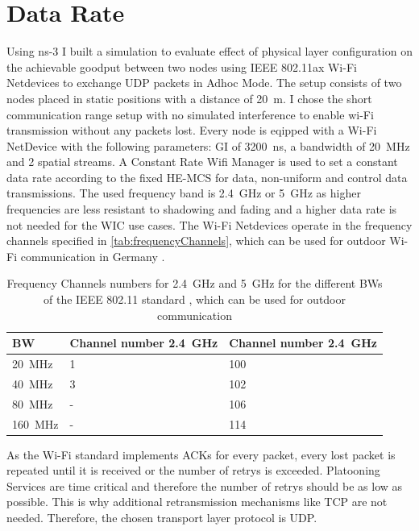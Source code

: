 \section{Data Rate}

Using ns-3 I built a simulation to evaluate effect of physical layer configuration on the achievable goodput between two nodes using IEEE 802.11ax Wi-Fi Netdevices to exchange UDP packets in Adhoc Mode.
The setup consists of two nodes placed in static positions with a distance of \SI{20}{\metre}. I chose the short communication range setup with no simulated interference to enable wi-Fi transmission without any packets lost.
Every node is eqipped with a Wi-Fi NetDevice with the following parameters: \ac{GI} of \SI{3200}{\nano\second}, a bandwidth of \SI{20}{\mega\hertz} and 2 spatial streams.
A Constant Rate Wifi Manager is used to set a constant data rate according to the fixed HE-\ac{MCS} for data, non-uniform and control data transmissions. The used frequency band is \SI{2.4}{\giga\hertz} or \SI{5}{\giga\hertz} as
higher frequencies are less resistant to shadowing and fading and a higher data rate is not needed for the \ac{WIC} use cases.
The Wi-Fi Netdevices operate in the frequency channels specified in \autoref{tab:frequencyChannels}, which can be used for
outdoor Wi-Fi communication in Germany \cite{GermanLaw}.

\begin{table}
	\centering
	\begin{tabular}{>{\centering}p{2cm}p{4cm}p{4cm}}
		\toprule
		\ac{BW} & Channel number \SI{2.4}{\giga\hertz} & Channel number \SI{2.4}{\giga\hertz}\\
		\midrule
		\SI{20}{\mega\hertz} & \num{1}&
		\num{100} \\
		\SI{40}{\mega\hertz} &
		\num{3}
		& \num{102} \\
		\SI{80}{\mega\hertz} &
		- & \num{106} \\
		\SI{160}{\mega\hertz} & -
		& \num{114} \\
		\bottomrule
	\end{tabular}
	\caption{Frequency Channels numbers for \SI{2.4}{\giga\hertz} and \SI{5}{\giga\hertz} for the different \ac{BW}s of the IEEE 802.11 standard \cite{noauthor_ieee_2021-1}, which can be used for
	outdoor communication \cite{GermanLaw}}
	\label{tab:frequencyChannels}
\end{table}

As the Wi-Fi standard implements ACKs for every packet, every lost packet is repeated until it is received or the number of retrys is
exceeded. Platooning Services are time critical and therefore the number of retrys should be as low as possible. This is why additional
retransmission mechanisms like TCP are not needed. Therefore, the chosen transport layer protocol is UDP.

